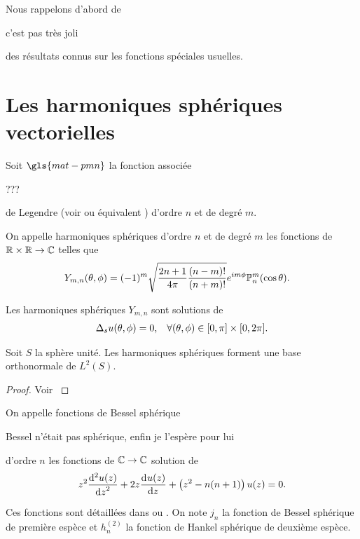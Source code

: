 Nous rappelons d'abord de \cite{nedelec_acoustic_2001}
\begin{REM}
  c'est pas très joli
\end{REM} 
 des résultats connus sur les fonctions spéciales usuelles.

\section{Les harmoniques sphériques vectorielles}

    \begin{defn}
        \label{def:sphere:harmoniques_spheriques}
        Soit \(\gls{mat-pmn}\) la fonction associée
\begin{REM}
  ???
\end{REM} 
         de Legendre (voir \cite[Chapitre.~8]{abramowitz_handbook_1964} ou équivalent \cite[\url{https://dlmf.nist.gov/14}]{dlmf_nist_2019}) d'ordre \(n\) et de degré \(m\). 

        On appelle harmoniques sphériques d'ordre \(n\) et de degré \(m\) les fonctions de \(\RR\times\RR \rightarrow \CC\) telles que
        \begin{align*}
            Y_{m,n}(\tp) &= (-1)^m\sqrt{\frac{2n+1}{4\pi}\frac{(n-m)!}{(n+m)!}}e^{im\phi}\PP^m_n(\cos \theta).
        \end{align*}
    \end{defn}

    \begin{prop}
        Les harmoniques sphériques \(Y_{m,n}\) sont solutions de 
        \begin{align*}
            \lapls{} u(\tp) = 0, && \forall (\tp) \in [0,\pi]\times[0,2\pi].
        \end{align*}
    \end{prop}
    \begin{prop}
        Soit \(S\) la sphère unité. Les harmoniques sphériques forment une base orthonormale de \(L^2(S)\).
    \end{prop}
    \begin{proof}
        Voir \cite[p.~14]{nedelec_acoustic_2001}
    \end{proof}

    \begin{defn}
        \label{def:sphere:bessel_spheriques}
        On appelle fonctions de Bessel sphérique
\begin{REM}
  Bessel n'était pas sphérique, enfin je l'espère pour lui
\end{REM} 
         d'ordre \(n\) les fonctions de \(\CC \rightarrow \CC\) solution de
        \begin{align*}
            z^{2}\ddp[2]{z}{u(z)}+2z\ddp{z}{u(z)}+\left(z^{2}-n(n+1)\right)u(z)=0.
        \end{align*}
    \end{defn}
    Ces fonctions sont détaillées dans \cite[p.~437]{abramowitz_handbook_1964} ou \cite[\url{https://dlmf.nist.gov/10.47}]{dlmf_nist_2019}.
    On note \(j_n\) la fonction de Bessel sphérique de première espèce et \(h^{(2)}_n\) la fonction de Hankel sphérique de deuxième espèce.

